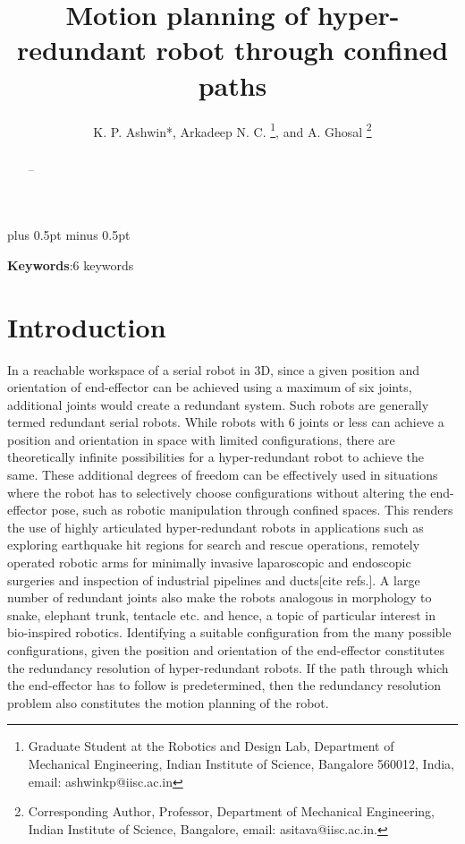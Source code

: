 \documentclass[12pt,a4]{article}
\begin{document}
%
\title{Motion planning of hyper-redundant robot through confined paths}
%
%
\author{K. P. Ashwin*, Arkadeep N. C.
\thanks{Graduate Student at the Robotics and Design Lab, Department
of Mechanical Engineering, Indian Institute of Science, Bangalore 560012, India, email: ashwinkp@iisc.ac.in}, 
 and A. Ghosal
\thanks{Corresponding Author, Professor, Department of Mechanical Engineering, Indian Institute of Science, Bangalore, email: asitava@iisc.ac.in.}}
%
\baselineskip 18pt plus 0.5pt minus 0.5pt
%
\date{}
\maketitle
\begin{abstract}
\label{sec:abstract}
--
\end{abstract}

\textbf{Keywords}:6 keywords
\pagebreak
\section{Introduction}
\label{sec:introduction}

In a reachable workspace of a serial robot in 3D, since a given position and orientation of end-effector can be achieved using a maximum of six joints, additional joints would create a redundant system. Such robots are generally termed redundant serial robots. While robots with 6 joints  or less can achieve a position and orientation in space with limited configurations, there are theoretically infinite possibilities for a hyper-redundant robot to achieve the same. These additional degrees of freedom can be effectively used in situations where the robot has to selectively choose configurations without altering the end-effector pose, such as robotic manipulation through confined spaces. This renders the use of highly articulated hyper-redundant robots in applications such as exploring earthquake hit regions for search and rescue operations, remotely operated robotic arms for minimally invasive laparoscopic and endoscopic surgeries and inspection of industrial pipelines and ducts[cite refs.]. A large number of redundant joints also make the robots analogous in morphology to  snake, elephant trunk, tentacle etc. and hence, a topic of particular interest in bio-inspired robotics. Identifying a suitable configuration from the many possible configurations, given the position and orientation of the end-effector constitutes the redundancy resolution of hyper-redundant robots. If the path through which the end-effector has to follow is predetermined, then the redundancy resolution problem also constitutes the motion planning of the robot.
\end{document}
